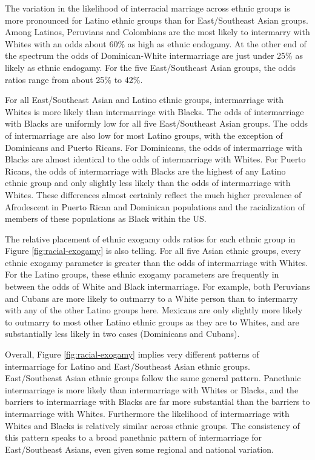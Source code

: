 \documentclass[11pt,]{article}
\begin{document}
The variation in the likelihood of interracial marriage across ethnic groups is more pronounced for Latino ethnic groups than for East/Southeast Asian groups. Among Latinos, Peruvians and Colombians are the most likely to intermarry with Whites with an odds about 60\% as high as ethnic endogamy. At the other end of the spectrum the odds of Dominican-White intermarriage are just under 25\% as likely as ethnic endogamy. For the five East/Southeast Asian groups, the odds ratios range from about 25\% to 42\%.

For all East/Southeast Asian and Latino ethnic groups, intermarriage with Whites is more likely than intermarriage with Blacks. The odds of intermarriage with Blacks are uniformly low for all five East/Southeast Asian groups. The odds of intermarriage are also low for most Latino groups, with the exception of Dominicans and Puerto Ricans. For Dominicans, the odds of intermarriage with Blacks are almost identical to the odds of intermarriage with Whites. For Puerto Ricans, the odds of intermarriage with Blacks are the highest of any Latino ethnic group and only slightly less likely than the odds of intermarriage with Whites. These differences almost certainly reflect the much higher prevalence of Afrodescent in Puerto Rican and Dominican populations and the racialization of members of these populations as Black within the US.

The relative placement of ethnic exogamy odds ratios for each ethnic group in Figure \ref{fig:racial-exogamy} is also telling. For all five Asian ethnic groups, every ethnic exogamy parameter is greater than the odds of intermarriage with Whites. For the Latino groups, these ethnic exogamy parameters are frequently in between the odds of White and Black intermarriage. For example, both Peruvians and Cubans are more likely to outmarry to a White person than to intermarry with any of the other Latino groups here. Mexicans are only slightly more likely to outmarry to most other Latino ethnic groups as they are to Whites, and are substantially less likely in two cases (Dominicans and Cubans).

Overall, Figure \ref{fig:racial-exogamy} implies very different patterns of intermarriage for Latino and East/Southeast Asian ethnic groups. East/Southeast Asian ethnic groups follow the same general pattern. Panethnic intermarriage is more likely than intermarriage with Whites or Blacks, and the barriers to intermarriage with Blacks are far more substantial than the barriers to intermarriage with Whites. Furthermore the likelihood of intermarriage with Whites and Blacks is relatively similar across ethnic groups. The consistency of this pattern speaks to a broad panethnic pattern of intermarriage for East/Southeast Asians, even given some regional and national variation.
\end{document}
